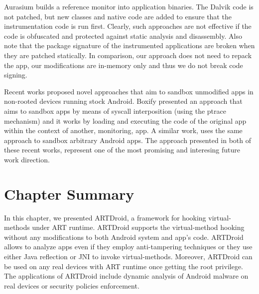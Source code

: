 Aurasium \cite{xu2012aurasium} builds a reference monitor into application binaries. The Dalvik code is not patched, but new classes and native code are added to ensure that the instrumentation code is run first. Clearly, such approaches are not effective if the code is obfuscated and protected against static analysis and disassembly. Also note that the package signature of the instrumented applications are broken when they are patched statically. In comparison, our approach does not need to repack the app, our modifications are in-memory only and thus we do not break code signing.

Recent works proposed novel approaches that aim to sandbox unmodified apps in non-rooted devices running stock Android. Boxify\cite{backes2015boxify} presented an approach that aims to sandbox apps by means of syscall interposition (using the ptrace mechanism) and it works by loading and executing the code of the original app within the context of another, monitoring, app. A similar work, \cite{bianchi2015njas} uses the same approach to sandbox arbitrary Android apps. The approach presented in both of these recent works, represent one of the most promising and interesing future work direction.

\section{Chapter Summary}
\label{sec:conclusion}
In this chapter, we presented ARTDroid, a framework for hooking virtual-methods under ART runtime. ARTDroid supports the virtual-method hooking without any modifications to both Android system and app's code. ARTDroid allows to analyze apps even if they employ anti-tampering techniques or they use either Java reflection or JNI to invoke virtual-methods. Moreover, ARTDroid can be used on any real devices with ART runtime once getting the root privilege. The applications of ARTDroid include dynamic analysis of Android malware on real devices or security policies enforcement.








